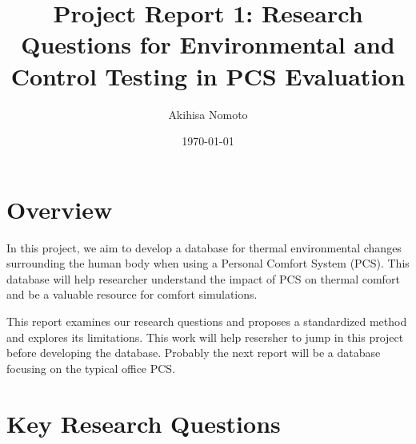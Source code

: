 \documentclass[11pt]{article}
\begin{document}
\title{Project Report 1: Research Questions for Environmental and Control Testing in PCS Evaluation}
\author{Akihisa Nomoto}
\date{\today}
\maketitle

%

\section*{Overview}

In this project, we aim to develop a database for thermal environmental changes surrounding the human body when using a Personal Comfort System (PCS).
This database will help researcher understand the impact of PCS on thermal comfort and be a valuable resource for comfort simulations.

This report examines our research questions and proposes a standardized method and explores its limitations. This work will help resersher to jump in this project before developing the database.
Probably the next report will be a database focusing on the typical office PCS.


\section*{Key Research Questions}
\end{document}
